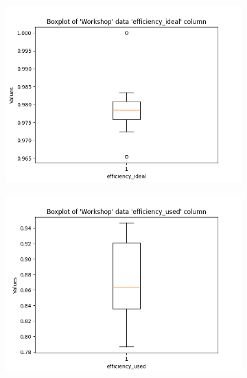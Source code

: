\begin{figure}[htb]
    \centering
    \begin{subfigure}[b]{0.45\textwidth}
        \centering
        \includegraphics[width=\textwidth]{Images/Workshop_efficiency_ideal_Boxplot.png}
        \caption{}
    \end{subfigure}
    \hfill
    \begin{subfigure}[b]{0.45\textwidth}
        \centering
        \includegraphics[width=\textwidth]{Images/Workshop_efficiency_used_Boxplot.png}
        \caption{}
    \end{subfigure}
    \caption{}
\end{figure}

